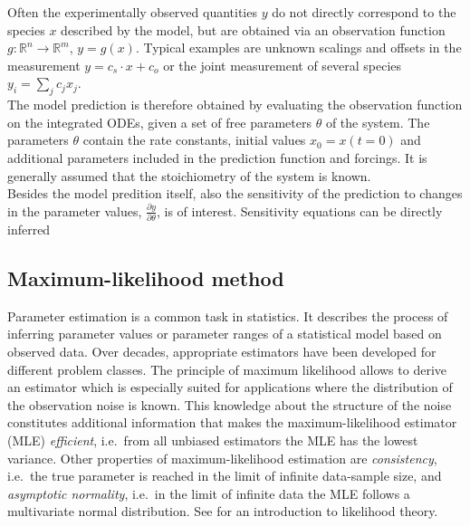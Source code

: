 \documentclass[article]{jss}
\begin{document}
Often the experimentally observed quantities $y$ do not directly correspond to the species $x$ described by the model, but are obtained via an observation function $g: \mathbb{R}^n \rightarrow \mathbb{R}^m$,  $y = g(x)$. Typical examples are unknown scalings and offsets in the measurement $y = c_s \cdot x + c_o$ or the joint measurement of several species $y_i = \sum_j c_j x_j$.   \\
The model prediction is therefore obtained by evaluating the observation function on the integrated ODEs, given a set of free parameters $\theta$ of the system. The parameters $\theta$ contain the rate constants, initial values $x_0 = x(t=0)$ and additional parameters included in the prediction function and forcings. It is generally assumed that the stoichiometry of the system is known. \\
Besides the model predition itself, also the sensitivity of the prediction to changes in the parameter values, $\frac{\partial y}{\partial \theta}$, is of interest. Sensitivity equations can be directly inferred  



\subsection{Maximum-likelihood method}

Parameter estimation is a common task in statistics. It describes the process of inferring parameter values or parameter ranges of a statistical model based on observed data. Over decades, appropriate estimators have been developed for different problem classes. The principle of maximum likelihood allows to derive an estimator which is especially suited for applications where the distribution of the observation noise is known. This knowledge about the structure of the noise constitutes additional information that makes the maximum-likelihood estimator (MLE) \textit{efficient}, i.e.~from all unbiased estimators the MLE has the lowest variance. Other properties of maximum-likelihood estimation are \textit{consistency}, i.e.~the true parameter is reached in the limit of infinite data-sample size, and \textit{asymptotic normality}, i.e.~in the limit of infinite data the MLE follows a multivariate normal distribution. See \citep{azzalini1996statistical} for an introduction to likelihood theory.
\end{document}
